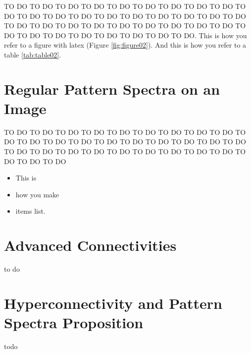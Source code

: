 TO DO TO DO TO DO TO DO TO DO TO DO TO DO TO DO TO DO TO DO TO DO TO DO TO DO TO DO TO DO TO DO TO DO TO DO TO DO TO DO TO DO TO DO TO DO TO DO TO DO TO DO TO DO TO DO TO DO TO DO TO DO TO DO TO DO TO DO TO DO TO DO. This is how you refer to a figure with latex (Figure \ref{fig:figure02}). And this is how you refer to a table \ref{tab:table02}.


\hypertarget{regular-ps}{%
\section{Regular Pattern Spectra on an Image}\label{regular-ps}}

    TO DO TO DO TO DO TO DO TO DO TO DO TO DO TO DO TO DO TO DO TO DO TO DO TO DO TO DO TO DO TO DO TO DO TO DO TO DO TO DO TO DO TO DO TO DO TO DO TO DO TO DO TO DO TO DO TO DO TO DO TO DO

\begin{itemize}
    \item This is 
    \item how you make 
    \item items list.
\end{itemize}


\hypertarget{advanced-connectivities}{%
\section{Advanced Connectivities}\label{advanced-connectivities}}

to do


\hypertarget{hp-ps}{%
\section{Hyperconnectivity and Pattern Spectra Proposition}\label{hp-ps}}

todo
